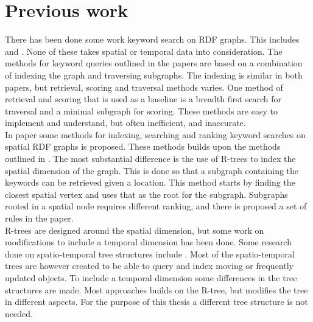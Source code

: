 \section{Previous work}
There has been done some work keyword search on RDF graphs. This includes \cite{4812421} and \cite{Elbassuoni:2011:KSO:2063576.2063615}. None of these takes spatial or temporal data into consideration. The methods for keyword queries outlined in the papers are based on a combination of indexing the graph and traversing subgraphs. The indexing is similar in both papers, but retrieval, scoring and traversal methods varies. One method of retrieval and scoring that is used as a baseline is a breadth first search for traversal and a minimal subgraph for scoring. These methods are easy to implement and understand, but often inefficient, and inaccurate.\\

In paper \cite{Shi:2016:TRS:2882903.2882941} some methods for indexing, searching and ranking keyword searches on spatial RDF graphs is proposed. These methods builds upon the methods outlined in \cite{4812421, Elbassuoni:2011:KSO:2063576.2063615}. The most substantial difference is the use of R-trees to index the spatial dimension of the graph. This is done so that a subgraph containing the keywords can be retrieved given a location. This method starts by finding the closest spatial vertex and uses that as the root for the subgraph. Subgraphs rooted in a spatial node requires different ranking, and there is proposed a set of rules in the paper.\\

R-trees are designed around the spatial dimension, but some work on modifications to include a temporal dimension has been done. Some research done on spatio-temporal tree structures include \cite{Tao:2003:TOS:1315451.1315519, r-tree-spatio-temporal}. Most of the spatio-temporal trees are however created to be able to query and index moving or frequently updated objects. To include a temporal dimension some differences in the tree structures are made. Most approaches builds on the R-tree, but modifies the tree in different aspects. For the purpose of this thesis a different tree structure is not needed.\\ %



\clearpage